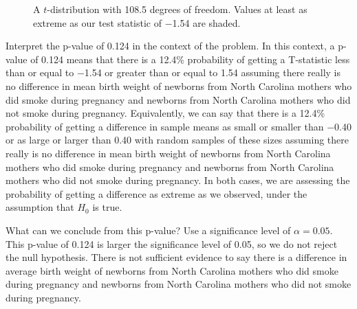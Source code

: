 \begin{figure}
\centering
\caption{A $t$-distribution with 108.5 degrees of freedom.  Values at least as extreme as our test statistic of $-$1.54 are shaded.}
\label{tdf108}
\end{figure}

\begin{examplewrap}
\begin{nexample}{Interpret the p-value of 0.124 in the context of the problem.}
In this context, a p-value of 0.124 means that there is a 12.4\% probability of getting a T-statistic less than or equal to $-$1.54 or greater than or equal to 1.54 assuming there really is no difference in mean birth weight of newborns from North Carolina mothers who did smoke during pregnancy and newborns from North Carolina mothers who did not smoke during pregnancy. Equivalently, we can say that there is a 12.4\% probability of getting a difference in sample means as small or smaller than $-$0.40 or as large or larger than 0.40 with random samples of these sizes assuming there really is no difference in mean birth weight of newborns from North Carolina mothers who did smoke during pregnancy and newborns from North Carolina mothers who did not smoke during pregnancy.  In both cases, we are assessing the probability of getting a difference as extreme as we observed, under the assumption that $H_0$ is true.
\label{pvaluediffofmeans}
\end{nexample}
\end{examplewrap}




\begin{examplewrap}
\begin{nexample}{What can we conclude from this p-value?  Use a significance level of $\alpha=0.05$.  }
\label{pictureOfPValueForEstimateOfDiffOfMeansOfBirthWeights}
This p-value of 0.124 is larger the significance level of 0.05, so we do not reject the null hypothesis. There is not sufficient evidence to say there is a difference in average birth weight of newborns from North Carolina mothers who did smoke during pregnancy and newborns from North Carolina mothers who did not smoke during pregnancy.
\end{nexample}
\end{examplewrap}




